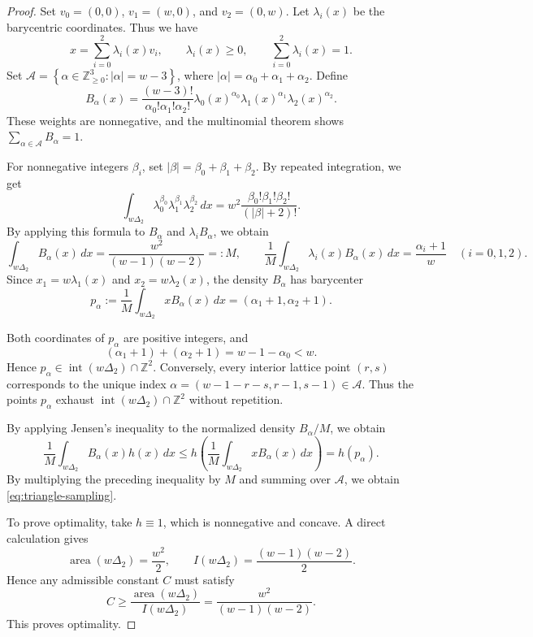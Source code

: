\documentclass[reqno, 11pt]{article}
\numberwithin{equation}{section}
\theoremstyle{definition}
\newcommand{\Z}{\mathbb Z}
\DeclareMathOperator{\Int}{int}
\DeclareMathOperator{\area}{area}
\numberwithin{equation}{section}
\begin{document}
\begin{proof}
Set $v_0=(0,0)$, $v_1=(w,0)$, and $v_2=(0,w)$.
Let $\lambda_i(x)$ be the barycentric coordinates. Thus we have 
\[
 x=\sum_{i=0}^2\lambda_i(x)v_i, \qquad \lambda_i(x)\ge0, \qquad \sum_{i=0}^2\lambda_i(x)=1.
\]
Set $\mathcal A=\left\{\alpha\in\Z_{\ge0}^3:|\alpha|=w-3\right\}$,
where $|\alpha|=\alpha_0+\alpha_1+\alpha_2$. Define
\[
 B_\alpha(x)=
 \frac{(w-3)!}{\alpha_0!\alpha_1!\alpha_2!}
 \lambda_0(x)^{\alpha_0}
 \lambda_1(x)^{\alpha_1}
 \lambda_2(x)^{\alpha_2}.
\]
These weights are nonnegative, and the multinomial theorem shows $\sum_{\alpha\in\mathcal A}B_\alpha=1$.

For nonnegative integers $\beta_i$, set $|\beta|=\beta_0+\beta_1+\beta_2$.
By repeated integration, we get 
\[
\int_{w\Delta_2}\lambda_0^{\beta_0}\lambda_1^{\beta_1}
\lambda_2^{\beta_2}\,dx
=w^2\frac{\beta_0!\beta_1!\beta_2!}{(|\beta|+2)!}.
\]
By applying this formula to $B_\alpha$ and $\lambda_iB_\alpha$, we obtain 
\[
 \int_{w\Delta_2} B_\alpha(x)\,dx
 =\frac{w^2}{(w-1)(w-2)}=:M,
 \qquad
 \frac1M\int_{w\Delta_2}\lambda_i(x)B_\alpha(x)\,dx
 =\frac{\alpha_i+1}{w}
 \quad(i=0,1,2).
\]
Since $x_1=w\lambda_1(x)$ and $x_2=w\lambda_2(x)$,
the density $B_\alpha$ has barycenter
\[
 p_\alpha
 :=\frac1M\int_{w\Delta_2} xB_\alpha(x)\,dx
 =(\alpha_1+1,\alpha_2+1).
\]

Both coordinates of $p_\alpha$ are positive integers, and
\[
 (\alpha_1+1)+(\alpha_2+1)=w-1-\alpha_0<w.
\]
Hence $p_\alpha\in\Int(w\Delta_2)\cap\Z^2$.
Conversely, every interior lattice point $(r,s)$ corresponds
to the unique index
$\alpha=(w-1-r-s,r-1,s-1)\in\mathcal A$.
Thus the points $p_\alpha$ exhaust $\Int(w\Delta_2)\cap\Z^2$
without repetition.

By applying Jensen's inequality to the normalized density $B_\alpha/M$, we obtain
\[
 \frac1M\int_{w\Delta_2} B_\alpha(x)h(x)\,dx
 \le
 h\left(\frac1M\int_{w\Delta_2} xB_\alpha(x)\,dx\right)
 =h(p_\alpha).
\]
By multiplying the preceding inequality by $M$ and summing over $\mathcal A$, we obtain \eqref{eq:triangle-sampling}.

To prove optimality, take $h\equiv1$, which is nonnegative
and concave. A direct calculation gives
\[
 \area(w\Delta_2)=\frac{w^2}{2},
 \qquad
 I(w\Delta_2)=\frac{(w-1)(w-2)}2.
\]
Hence any admissible constant $C$ must satisfy
\[
 C\ge\frac{\area(w\Delta_2)}{I(w\Delta_2)} =\frac{w^2}{(w-1)(w-2)}.
\]
This proves optimality. 
\end{proof}
\end{document}

